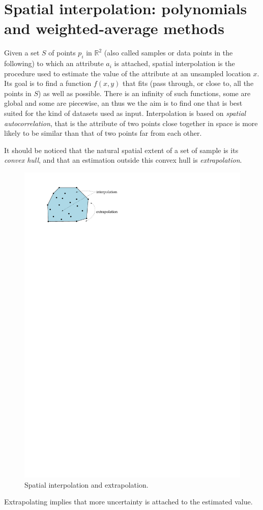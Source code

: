 
\graphicspath{{interpol/}}

\chapter{Spatial interpolation: polynomials and weighted-average methods}%
\label{chap:interpol}



Given a set $S$ of points $p_i$ in $\mathbb{R}^2$ (also called samples or data points in the following) to which an attribute $a_i$ is attached, spatial interpolation is the procedure used to estimate the value of the attribute at an unsampled location $x$. 
Its goal is to find a function $f(x,y)$ that fits (pass through, or close to, all the points in $S$) as well as possible. 
There is an infinity of such functions, some are global and some are piecewise, an thus we the aim is to find one that is best suited for the kind of datasets used as input.
Interpolation is based on \emph{spatial autocorrelation}, that is the attribute of two points close together in space is more likely to be similar than that of two points far from each other.

%

It should be noticed that the natural spatial extent of a set of sample is its \emph{convex hull}, and that an estimation outside this convex hull is \emph{extrapolation}.
\begin{figure}
  \centering
  \includegraphics[width=0.4\linewidth]{figs/extrapolation}
  \caption{Spatial interpolation and extrapolation.}
\label{fig:extrapolation}
\end{figure}
Extrapolating implies that more uncertainty is attached to the estimated value.

